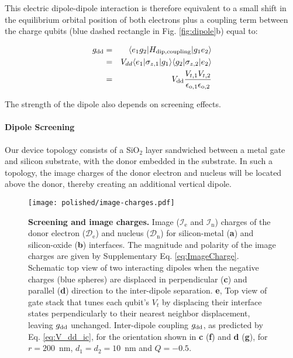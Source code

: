 This electric dipole-dipole interaction is therefore equivalent to a small shift in the equilibrium orbital position of both electrons plus a coupling term between the charge qubits (blue dashed rectangle in Fig. \ref{fig:dipole}b) equal to:

\begin{eqnarray} \label{eq:g_dd}
g_{\rm dd} & = & \langle e_1g_2|H_{\rm dip, coupling}|g_1e_2\rangle\\
 & = & V_{dd}\langle e_1|\sigma_{z,1}|g_1\rangle\langle g_2|\sigma_{z,2}|e_2\rangle\\
 & = &  V_{\rm dd}\frac{V_{t,1}V_{t,2}}{\epsilon_{\rm o,1}\epsilon_{\rm o,2}}
\end{eqnarray}

The strength of the dipole also depends on screening effects.   

\paragraph{Dipole Screening}

Our device topology consists of a SiO$_2$ layer sandwiched between a metal gate and silicon substrate, with the donor embedded in the substrate. In such a topology, the image charges of the donor electron and nucleus will be located above the donor, thereby creating an additional vertical dipole.

\begin{figure}
\centering
\texttt{[image: polished/image-charges.pdf]}
\caption[Screening and image charges]{\textbf{Screening and image charges.} Image ($\mathcal{I}_\mathrm{e}$ and $\mathcal{I}_\mathrm{n}$) charges of the donor electron ($\mathcal{D}_\mathrm{e}$) and nucleus ($\mathcal{D}_\mathrm{n}$) for silicon-metal (\textbf{a}) and silicon-oxide (\textbf{b}) interfaces. The magnitude and polarity of the image charges are given by Supplementary Eq. \ref{eq:ImageCharge}. Schematic top view of two interacting dipoles when the negative charges (blue spheres) are displaced in perpendicular (\textbf{c}) and parallel (\textbf{d}) direction to the inter-dipole separation. \textbf{e}, Top view of gate stack that tunes each qubit's $V_t$ by displacing their interface states perpendicularly to their nearest neighbor displacement, leaving $g_{\rm dd}$ unchanged. Inter-dipole coupling $g_{\rm dd}$, as predicted by Eq. \ref{eq:V_dd_ic}, for the orientation shown in \textbf{c} (\textbf{f}) and \textbf{d} (\textbf{g}), for $r=200$~nm, $d_1=d_2=10$~nm and $Q=-0.5$.}
\label{fig:image_charge}
\end{figure}

